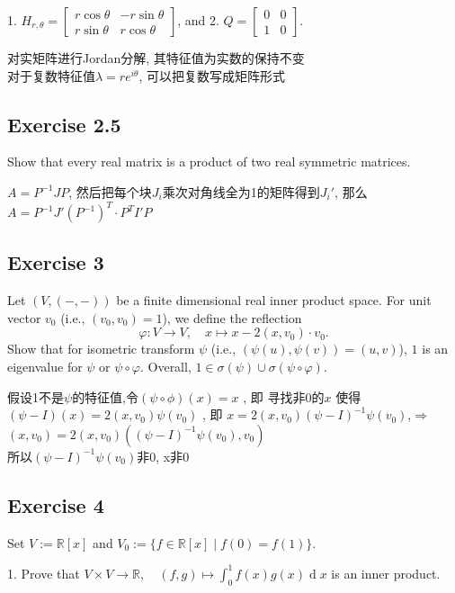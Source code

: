 \documentclass[11pt]{ctexart}
\theoremstyle{definition}
\numberwithin{equation}{section}
\theoremstyle{definition}
\theoremstyle{remark}
\begin{document}
   1. $H_{r,\theta} = \begin{bmatrix}
      r\cos \theta  & -r\sin \theta \\
      r\sin \theta  & r\cos \theta 
      \end{bmatrix}$, and
   2. $Q = \begin{bmatrix}
      0 & 0 \\ 1 & 0
      \end{bmatrix}$.
\begin{aaa}
    对实矩阵进行Jordan分解, 其特征值为实数的保持不变\\
    对于复数特征值$\lambda=re^{i\theta}$, 可以把复数写成矩阵形式 
\end{aaa}
\subsection{Exercise 2.5}
Show that every real matrix is a product of two real symmetric matrices.
\begin{aaa}
    $A=P^{-1}JP$, 然后把每个块$J_i$乘次对角线全为1的矩阵得到$J_i'$, 那么$A=P^{-1}J'(P^{-1})^T\cdot P^TI'P$
\end{aaa}
\subsection{Exercise 3}
Let $(V, (-,-))$ be a finite dimensional real inner product space. For unit vector $v_0$ (i.e., $(v_0,v_0)=1$), we define the reflection
$$
\varphi : V \to V,\quad x \mapsto x - 2(x,v_0)\cdot v_0.
$$
Show that for isometric transform $\psi$ (i.e., $(\psi(u), \psi (v)) = (u,v)$), $1$ is an eigenvalue for $\psi$ or $\psi \circ \varphi$. Overall, $1 \in \sigma (\psi) \cup \sigma (\psi \circ \varphi)$.
\begin{aaa}
    假设1不是$\psi$的特征值,令$(\psi\circ \phi)(x)= x $ , 即 寻找非0的$x$ 使得 $(\psi-I)(x) = 2(x,v_0)\psi(v_0)$ , 即 $x = 2(x,v_0)(\psi-I)^{-1}\psi(v_0)$,$\Rightarrow$$(x,v_0) = 2(x,v_0)((\psi-I)^{-1}\psi(v_0),v_0)$\\
    所以$(\psi-I)^{-1}\psi(v_0)$非0, x非0
\end{aaa}
\subsection{Exercise 4}
Set $V:=\mathbb R[x]$ and $V_0:=\{f\in \mathbb R[x]\mid f(0)=f(1)\}$.

1. Prove that $V\times V\to \mathbb R,\quad (f,g)\mapsto \int_0^1 f(x)g(x)\operatorname dx$ is an inner product.
\end{document}
